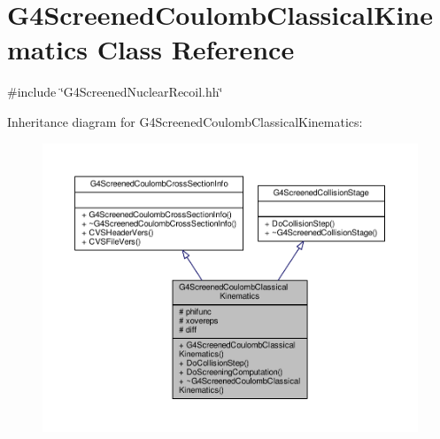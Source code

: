 \hypertarget{classG4ScreenedCoulombClassicalKinematics}{}\section{G4\+Screened\+Coulomb\+Classical\+Kinematics Class Reference}
\label{classG4ScreenedCoulombClassicalKinematics}


{\ttfamily \#include \char`\"{}G4\+Screened\+Nuclear\+Recoil.\+hh\char`\"{}}



Inheritance diagram for G4\+Screened\+Coulomb\+Classical\+Kinematics\+:
\nopagebreak
\begin{figure}[H]
\begin{center}
\leavevmode
\includegraphics[width=350pt]{classG4ScreenedCoulombClassicalKinematics__inherit__graph}
\end{center}
\end{figure}


